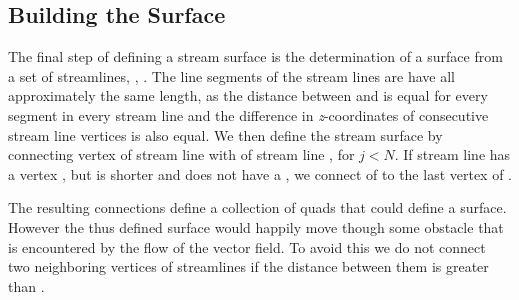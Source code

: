 \subsection{Building the Surface}
\label{s:streamsurface:method:surface}
The final step of defining a stream surface is the determination of a surface from a set of streamlines, , . The line segments of the stream lines are have all approximately the same length, as the distance between  and  is equal for every segment in every stream line and the difference in \textit{z}-coordinates of consecutive stream line vertices is also equal. We then define the stream surface by connecting vertex  of stream line  with  of stream line , for $j < N$. If stream line  has a vertex , but  is shorter and does not have a , we connect  of  to the last vertex of .


The resulting connections define a collection of quads that could define a surface. However the thus defined surface would happily move though some obstacle that is encountered by the flow of the vector field. To avoid this we do not connect two neighboring vertices of streamlines if the distance between them is greater than \divergenceCriterion. 
